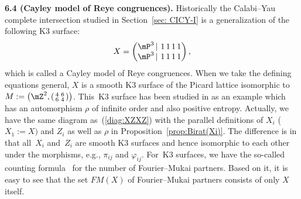 \documentclass[10pt,a4paper]{amsart}
\numberwithin{equation}{section}
\begin{document}
{\bf 6.4 (Cayley model of Reye congruences).} Historically the Calabi--Yau complete intersection studied in Section~\ref{sec: CICY-I} is a generalization of the following K3 surface:
\begin{gather*}
X=\left(\begin{matrix}\mP^{3}\,|\,\,1\,1\,1\,1\\
\mP^{3}\,|\,\,1\,1\,1\,1
\end{matrix}\right),
\end{gather*}
which is called a Cayley model of Reye congruences. When we take the defining equations general, $X$ is a smooth K3 surface of the Picard lattice isomorphic to $M:=\left(\mZ^{2},\left(\begin{smallmatrix}4 & 6\\
6 & 4
\end{smallmatrix}\right)\right)$. This~K3 surface has been studied in \cite{FGvGvL, Oguiso2} as an example which has an automorphism $\rho$ of infinite order and also positive entropy. Actually, we have the same diagram as~(\ref{diag:XZXZ}) with the parallel definitions of $X_{i}$ ($X_{1}:=X)$ and $Z_{i}$ as well as $\rho$ in Proposition~\ref{prop:Birat(Xi)}. The difference is in that all~$X_{i}$ and~$Z_{i}$ are smooth K3 surfaces and hence
isomorphic to each other under the morphisms, e.g., $\pi_{ij}$ and $\varphi_{ij}$. For~K3 surfaces, we have the so-called counting formula~\cite{HLOY} for the number of Fourier--Mukai partners. Based on it, it is easy to see that the set $FM(X)$ of Fourier--Mukai partners consists of only $X$ itself.
\end{document}
